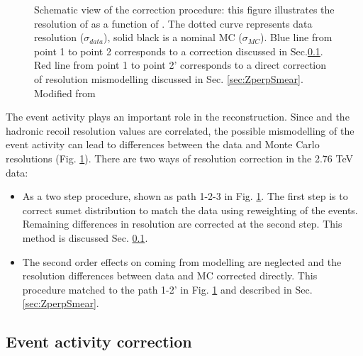 \begin{figure}[!tbp]
\begin{center}

\begin{minipage}[h]{0.7\linewidth}
\end{minipage}

\end{center}
\caption{Schematic view of the correction procedure: this figure illustrates the resolution of \uperp as a function of \sumet. The dotted curve represents data resolution ($\sigma_{data}$), solid black is a nominal MC ($\sigma_{MC}$). Blue line from point 1 to point 2 corresponds to a \sumet correction discussed in Sec.\ref{sec:SumetCor}. Red line from point 1 to point 2' corresponds to a direct correction of resolution mismodelling discussed in Sec. \ref{sec:ZperpSmear}. Modified from \cite{HRCorrections}}

\label{ris:sumetCor}
\end{figure}


The event activity plays an important role in the \etmiss reconstruction. Since \sumet and the hadronic recoil resolution values are correlated, the possible mismodelling of the event activity can lead to differences between the data and Monte Carlo \etmiss resolutions (Fig. \ref{ris:sumetCor}). There are two ways of resolution correction in the 2.76 TeV data:
\begin{itemize}
\item As a two step procedure, shown as path 1-2-3 in Fig. \ref{ris:sumetCor}. The first step is to correct sumet distribution to match the data using reweighting of the events. Remaining differences in resolution are corrected at the second step. This method is discussed Sec. \ref{sec:SumetCor}. 
\item The second order effects on \etmiss coming from \sumet modelling are neglected and the resolution differences between data and MC corrected directly. This procedure matched to the path 1-2' in Fig. \ref{ris:sumetCor} and described in Sec. \ref{sec:ZperpSmear}.
\end{itemize}


\subsection{ Event activity correction}\label{sec:SumetCor}



